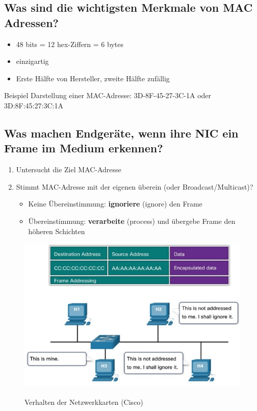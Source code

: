\subsection*{Was sind die wichtigsten Merkmale von MAC Adressen?}
\begin{itemize}
    \item 48 bits = 12 hex-Ziffern = 6 bytes
    \item einzigartig
    \item Erste Hälfte von Hersteller, zweite Hälfte zufällig
\end{itemize}
Beispiel Darstellung einer MAC-Adresse: 3D-8F-45-27-3C-1A oder 3D:8F:45:27:3C:1A

\subsection*{Was machen Endgeräte, wenn ihre NIC ein Frame im Medium erkennen?}\label{sub:Frameerkennung}
\begin{enumerate}
    \item Untersucht die Ziel MAC-Adresse
    \item Stimmt MAC-Adresse mit der eigenen überein (oder Broadcast/Multicast)?
    \begin{itemize}
        \item Keine Übereinstimmung: \textbf{ignoriere} (ignore) den Frame
        \item Übereinstimmung: \textbf{verarbeite} (process) und übergebe Frame den höheren Schichten
    \end{itemize}
\end{enumerate}

\begin{figure}[H]
    \begin{center}
    \label{pic:EthernetFrameProcessing}
    \includegraphics[width=\textwidth]{images/Frame_processing.jpg}
    \caption{Verhalten der Netzwerkkarten (\textsuperscript{\textcopyright}Cisco)}
    \end{center}
\end{figure}

